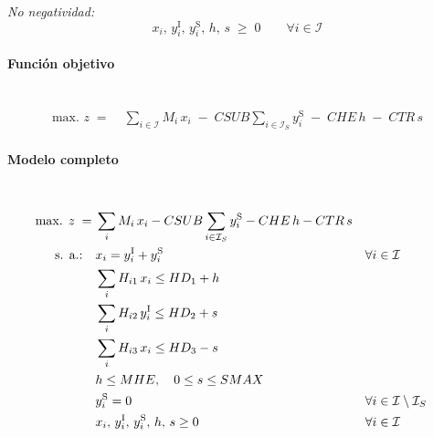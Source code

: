 \textit{No negatividad:}
\begin{equation}
x_i,\, y_i^{\mathrm{I}},\, y_i^{\mathrm{S}},\, h,\, s \;\geq\; 0 \qquad \forall i \in \mathcal{I}
\end{equation}

\paragraph{Función objetivo}\mbox{}\\
\begin{align}
\mbox{max. } z \;=\;&
\sum_{i\in\mathcal{I}} M_i\, x_i
\;-\; CSUB \sum_{i\in\mathcal{I}_S} y_i^{\mathrm{S}}
\;-\; CHE\, h
\;-\; CTR\, s
\end{align}

\paragraph{Modelo completo}\mbox{}\\[-1mm]
\begin{align}
\mbox{max. } z \;=\;&
\sum_i M_i\, x_i
- CSUB \sum_{i\in\mathcal{I}_S} y_i^{\mathrm{S}}
- CHE\, h
- CTR\, s \notag\\
\mbox{s. a.:}\quad
& x_i = y_i^{\mathrm{I}} + y_i^{\mathrm{S}} && \forall i \in \mathcal{I} \notag\\
& \sum_i H_{i1}\, x_i \leq HD_1 + h \notag\\
& \sum_i H_{i2}\, y_i^{\mathrm{I}} \leq HD_2 + s \notag\\
& \sum_i H_{i3}\, x_i \leq HD_3 - s \notag\\
& h \leq MHE,\quad 0 \leq s \leq SMAX \notag\\
& y_i^{\mathrm{S}} = 0 && \forall i \in \mathcal{I}\setminus\mathcal{I}_S \notag\\
& x_i,\, y_i^{\mathrm{I}},\, y_i^{\mathrm{S}},\, h,\, s \geq 0 && \forall i \in \mathcal{I} \notag
\end{align}
